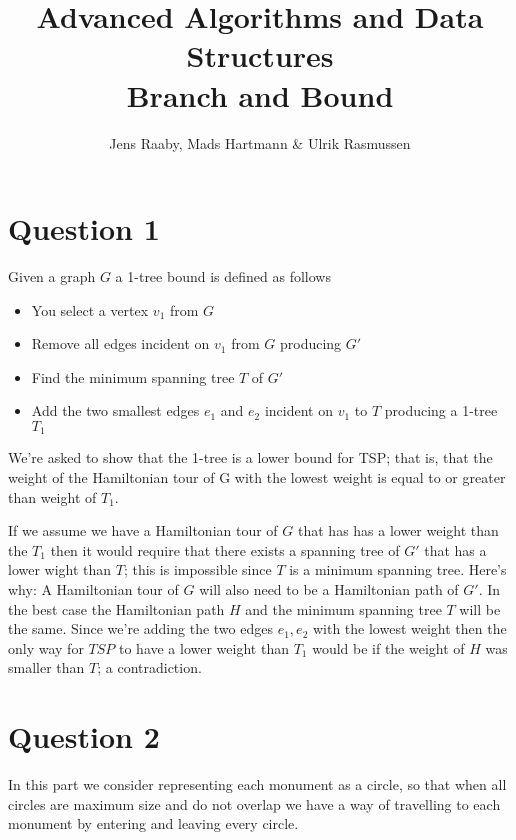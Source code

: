 \documentclass[a4paper, 10pt, oneside, article]{memoir}
\title{Advanced Algorithms and Data Structures\\ Branch and Bound}
\author{Jens Raaby, Mads Hartmann \& Ulrik Rasmussen}
\begin{document}
\maketitle

\section*{Question 1}


Given a graph $G$ a 1-tree bound is defined as follows 

\begin{itemize}
  \item You select a vertex $v_1$ from $G$
  \item Remove all edges incident on $v_1$ from $G$ producing $G'$
  \item Find the minimum spanning tree $T$ of $G'$
  \item Add the two smallest edges $e_1$ and $e_2$ incident on $v_1$ to $T$ producing a 1-tree $T_1$
\end{itemize}

We're asked to show that the 1-tree is a lower bound for TSP; that is,
that the weight of the Hamiltonian tour of G with the lowest weight
is equal to or greater than weight  of $T_1$.

If we assume we have a Hamiltonian tour of $G$ that has has a lower
weight than the $T_1$ then it would require that there exists a
spanning tree of $G'$ that  has a lower wight than $T$; this is
impossible since $T$ is a minimum spanning tree. Here's why: A Hamiltonian
tour of $G$ will also need to be a Hamiltonian path of $G'$. In the best case 
the Hamiltonian path $H$ and the minimum spanning tree $T$ will be the same. Since we're
adding the two edges $e_1, e_2$ with the lowest weight then the only way for
$TSP$ to have a lower weight than $T_1$ would be if the weight of $H$ was smaller 
than $T$; a contradiction.





\section*{Question 2}
In this part we consider representing each monument as a circle, so that when all circles are maximum size and do not overlap we have a way of travelling to each monument by entering and leaving every circle.
\end{document}
